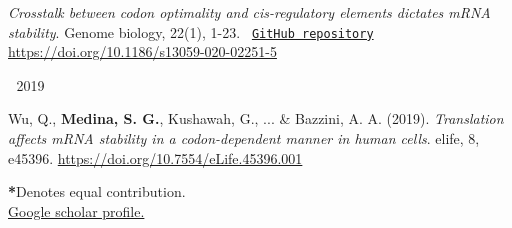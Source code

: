 \begin{cventries}
{\begin{cvitems}
{\begin{flushleft}
              \textit{Crosstalk between codon optimality and cis-regulatory elements dictates mRNA stability}. Genome biology, 22(1), 1-23.
              \texttt{
              \href{https://github.com/santiago1234/MZT-rna-stability}{GitHub repository}
              }
              \linebreak
              \url{https://doi.org/10.1186/s13059-020-02251-5}
            \end{flushleft}
          }
      \end{cvitems}
    }
  \cventry
    {$\;$}
    {2019}
    {$\;$}
    {$\;$}
    {
      \begin{cvitems} %
        \item {
          \begin{flushleft}
            Wu, Q., \textbf{Medina, S. G.}, Kushawah, G., ... \& Bazzini, A. A. (2019).
            \textit{Translation affects mRNA stability in a codon-dependent manner in human cells}.
            elife, 8, e45396.\linebreak
            \url{https://doi.org/10.7554/eLife.45396.001}
          \end{flushleft}
        }
      \end{cvitems}
    }


\end{cventries}

{\footnotesize \textbf{*}Denotes equal contribution.}\\
{\footnotesize \href{https://scholar.google.com/citations?user=XW3Sz1kAAAAJ&hl=es&oi=sra}{Google scholar profile.}}\\
\\